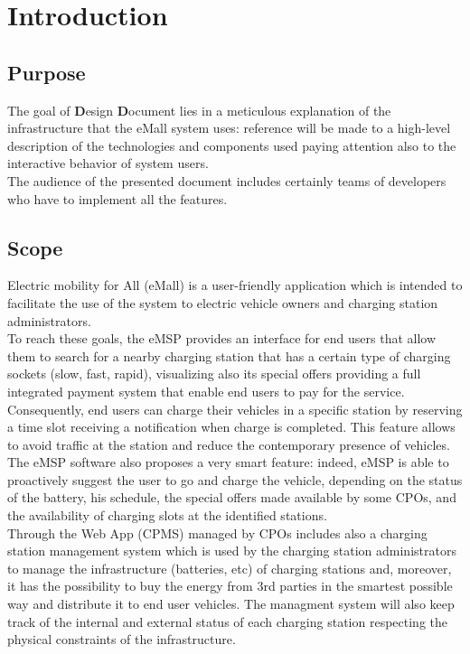 \chapter{Introduction}
\section{Purpose}
The goal of \textbf{D}esign \textbf{D}ocument lies in a meticulous explanation of the infrastructure that the eMall system uses: reference will be made to a high-level description of the technologies and components used paying attention also to the interactive behavior of system users.\\
The audience of the presented document includes certainly teams of developers who have to implement all the features.
\section{Scope}
Electric mobility for All (eMall) is a user-friendly application which is intended to facilitate the
use of the system to electric vehicle owners and charging station administrators.\\
To reach these goals, the eMSP provides an interface for end users that allow them to search
for a nearby charging station that has a certain type of charging sockets (slow, fast, rapid),
visualizing also its special offers providing a full integrated payment system that enable end users to pay for
the service. Consequently, end users can charge their vehicles in a specific station by reserving a time slot receiving a notification when charge is completed. This feature allows to avoid traffic at the station and reduce the contemporary presence of vehicles.\\
The eMSP software also proposes a very smart feature: indeed, eMSP is able to proactively suggest the user to go and charge the vehicle, depending on the status of the
battery, his schedule, the special offers made available by some
CPOs, and the availability of charging slots at the identified stations.\\
Through the Web App (CPMS) managed by CPOs includes also a charging station management system which is used by the charging station administrators to manage the infrastructure (batteries, etc) of charging stations and, moreover, it has the possibility to buy the energy from 3rd parties in the smartest
possible way and distribute it to end user vehicles. The managment system will also keep
track of the internal and external status of each charging station respecting the physical
constraints of the infrastructure.

